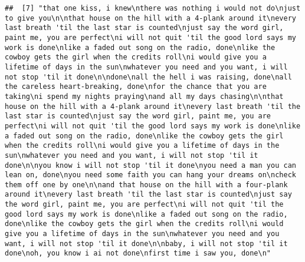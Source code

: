 \documentclass[]{article}
\begin{document}
\begin{verbatim}
##  [7] "that one kiss, i knew\nthere was nothing i would not do\njust to give you\n\nthat house on the hill with a 4-plank around it\nevery last breath 'til the last star is counted\njust say the word girl, paint me, you are perfect\ni will not quit 'til the good lord says my work is done\nlike a faded out song on the radio, done\nlike the cowboy gets the girl when the credits roll\ni would give you a lifetime of days in the sun\nwhatever you need and you want, i will not stop 'til it done\n\ndone\nall the hell i was raising, done\nall the careless heart-breaking, done\nfor the chance that you are taking\ni spend my nights praying\nand all my days chasing\n\nthat house on the hill with a 4-plank around it\nevery last breath 'til the last star is counted\njust say the word girl, paint me, you are perfect\ni will not quit 'til the good lord says my work is done\nlike a faded out song on the radio, done\nlike the cowboy gets the girl when the credits roll\ni would give you a lifetime of days in the sun\nwhatever you need and you want, i will not stop 'til it done\n\nyou know i will not stop 'til it done\nyou need a man you can lean on, done\nyou need some faith you can hang your dreams on\ncheck them off one by one\n\nand that house on the hill with a four-plank around it\nevery last breath 'til the last star is counted\njust say the word girl, paint me, you are perfect\ni will not quit 'til the good lord says my work is done\nlike a faded out song on the radio, done\nlike the cowboy gets the girl when the credits roll\ni would give you a lifetime of days in the sun\nwhatever you need and you want, i will not stop 'til it done\n\nbaby, i will not stop 'til it done\noh, you know i ai not done\nfirst time i saw you, done\n"                                                                                                                                                                                                                                                                                                                                                                                                                                                                                                                                                                                                                                                                                                                                                                                                                                                                                                                                                                                                                                                                                                                                                                      

\end{verbatim}
\end{document}
